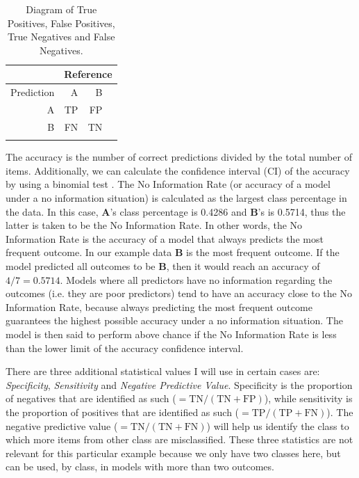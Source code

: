 \begin{table}[!htpb]
  \centering
  \begin{tabular}{rrrr}
    \lsptoprule
               & \multicolumn{3}{c}{Reference} \\
    \midrule
    Prediction & A  & B                        \\
    A          & TP & FP                       \\
    B          & FN & TN                       \\
    \lspbottomrule
  \end{tabular}
  \caption{Diagram of True Positives, False Positives, True Negatives and False Negatives.}\label{tab:tpfp-conf}
\end{table}

The accuracy is the number of correct predictions divided by the total number of items. Additionally, we can calculate the confidence interval (CI) of the accuracy by using a binomial test \autocite{Clopper.1934, Newcombe.1998}. The No Information Rate (or accuracy of a model under a no information situation) is calculated as the largest class percentage in the data. In this case, \textbf{A}'s class percentage is 0.4286 and \textbf{B}'s is 0.5714, thus the latter is taken to be the No Information Rate. In other words, the No Information Rate is the accuracy of a model that always predicts the most frequent outcome. In our example data \textbf{B} is the most frequent outcome. If the model predicted all outcomes to be \textbf{B}, then it would reach an accuracy of $4/7=0.5714$. Models where all predictors have no information regarding the outcomes (i.e. they are poor predictors) tend to have an accuracy close to the No Information Rate, because always predicting the most frequent outcome guarantees the highest possible accuracy under a no information situation. The model is then said to perform above chance if the No Information Rate is less than the lower limit of the accuracy confidence interval.

There are three additional statistical values I will use in certain cases are: \textit{Specificity}, \textit{Sensitivity} and \textit{Negative Predictive Value}. Specificity is the proportion of negatives that are identified as such ($=\textrm{TN}/(\textrm{TN}+\textrm{FP})$), while sensitivity is the proportion of positives that are identified as such ($=\textrm{TP}/(\textrm{TP}+\textrm{FN})$). The negative predictive value ($=\textrm{TN}/(\textrm{TN}+\textrm{FN})$) will help us identify the class to which more items from other class are misclassified. These three statistics are not relevant for this particular example because we only have two classes here, but can be used, by class, in models with more than two outcomes.

